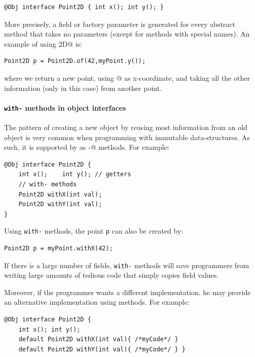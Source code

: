 \begin{lstlisting}
@Obj interface Point2D { int x(); int y(); }
\end{lstlisting}

\noindent More precisely, a field or factory parameter is generated for every
abstract method that takes no parameters (except for methods with special
names). An example of using \Q@Point2D@ is:
\begin{lstlisting}
Point2D p = Point2D.of(42,myPoint.y());
\end{lstlisting}
\noindent where we return a new point, using @ as x-coordinate,
and taking all the other information (only \Q@y@ in this case) from
another point.

\paragraph{\texttt{with-} methods in object interfaces}
The pattern of creating a new object by reusing most information from an old
object is very common when programming with immutable
data-structures. As such, it is
supported by \mixin as \Q@with-@ methods. For example:
\begin{lstlisting}
@Obj interface Point2D {
    int x();    int y(); // getters
    // with- methods
    Point2D withX(int val);
    Point2D withY(int val);
}
\end{lstlisting}

\noindent Using \texttt{with-} methods, the point \texttt{p} can also be created
by:

\begin{lstlisting}
Point2D p = myPoint.withX(42);
\end{lstlisting}

\noindent If there is a large number of fields, \texttt{with-} methods
will save programmers from writing large amounts of tedious code that
simply copies field values.

Moreover, if the programmer wants a different implementation, he may
provide an alternative implementation using \Q@default@ methods. For example:
\begin{lstlisting}
@Obj interface Point2D {
    int x(); int y();
    default Point2D withX(int val){ /*myCode*/ }
    default Point2D withY(int val){ /*myCode*/ } }
\end{lstlisting}

